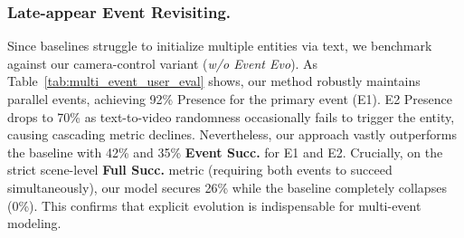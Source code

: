 \begin{table}[t!]
\centering
\footnotesize

\setlength{\tabcolsep}{8pt}
\caption{User study on late-appearing event revisit success rate, higher is better (\%).}
\label{tab:multi_event_user_eval}
\vspace{-1mm}
\end{table}

\vspace{-2mm}
\subsubsection{Late-appear Event Revisiting.}
Since baselines struggle to initialize multiple entities via text, we benchmark against our camera-control variant (\textit{w/o Event Evo}). As Table~\ref{tab:multi_event_user_eval} shows, our method robustly maintains parallel events, achieving 92\% Presence for the primary event (E1). E2 Presence drops to 70\% as text-to-video randomness occasionally fails to trigger the entity, causing cascading metric declines. Nevertheless, our approach vastly outperforms the baseline with 42\% and 35\% \textbf{Event Succ.} for E1 and E2. Crucially, on the strict scene-level \textbf{Full Succ.} metric (requiring both events to succeed simultaneously), our model secures 26\% while the baseline completely collapses (0\%). This confirms that explicit evolution is indispensable for multi-event modeling.




